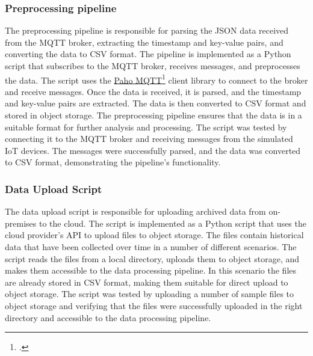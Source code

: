 \subsubsection{Preprocessing pipeline}
The preprocessing pipeline is responsible for parsing the JSON data received from the MQTT broker, extracting the timestamp and key-value pairs, and converting the data to CSV format. The pipeline is implemented as a Python script that subscribes to the MQTT broker, receives messages, and preprocesses the data. The script uses the \href{https://pypi.org/project/paho-mqtt/}{Paho MQTT}\footcite{site:paho-mqtt} client library to connect to the broker and receive messages. Once the data is received, it is parsed, and the timestamp and key-value pairs are extracted. The data is then converted to CSV format and stored in object storage. The preprocessing pipeline ensures that the data is in a suitable format for further analysis and processing. The script was tested by connecting it to the MQTT broker and receiving messages from the simulated IoT devices. The messages were successfully parsed, and the data was converted to CSV format, demonstrating the pipeline's functionality.

\subsubsection{Data Upload Script}
The data upload script is responsible for uploading archived data from on-premises to the cloud. The script is implemented as a Python script that uses the cloud provider's API to upload files to object storage. The files contain historical data that have been collected over time in a number of different scenarios. The script reads the files from a local directory, uploads them to object storage, and makes them accessible to the data processing pipeline. In this scenario the files are already stored in CSV format, making them suitable for direct upload to object storage. The script was tested by uploading a number of sample files to object storage and verifying that the files were successfully uploaded in the right directory and accessible to the data processing pipeline. 


